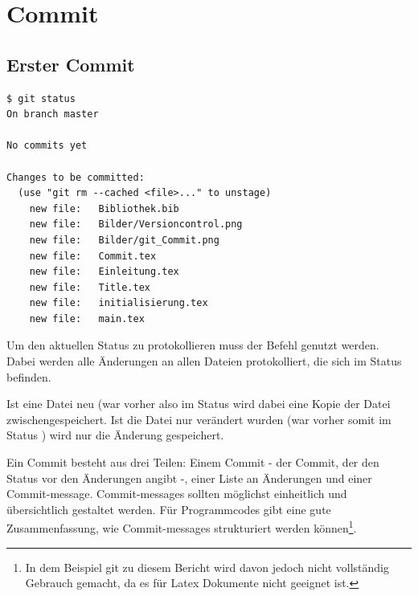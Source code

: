 \section{Commit}
\subsection{Erster Commit}
\begin{lstlisting}
$ git status
On branch master

No commits yet

Changes to be committed:
  (use "git rm --cached <file>..." to unstage)
	new file:   Bibliothek.bib
	new file:   Bilder/Versioncontrol.png
	new file:   Bilder/git_Commit.png
	new file:   Commit.tex
	new file:   Einleitung.tex
	new file:   Title.tex
	new file:   initialisierung.tex
	new file:   main.tex

\end{lstlisting}
Um den aktuellen Status zu protokollieren muss der Befehl  genutzt werden. Dabei werden alle Änderungen an allen Dateien protokolliert, die sich im Status  befinden.

Ist eine Datei neu (war vorher also im Status  wird dabei eine Kopie der Datei zwischengespeichert. Ist die Datei nur verändert wurden (war vorher somit im Status ) wird nur die Änderung gespeichert.

Ein Commit besteht aus drei Teilen: Einem  Commit - der Commit, der den Status vor den Änderungen angibt -, einer Liste an Änderungen und einer Commit-message. Commit-messages sollten möglichst einheitlich und übersichtlich gestaltet werden. Für Programmcodes gibt \cite{conv-Commit} eine gute Zusammenfassung, wie Commit-messages strukturiert werden können\footnote{In dem Beispiel git zu diesem Bericht wird davon jedoch nicht vollständig Gebrauch gemacht, da es für Latex Dokumente nicht geeignet ist.}.

